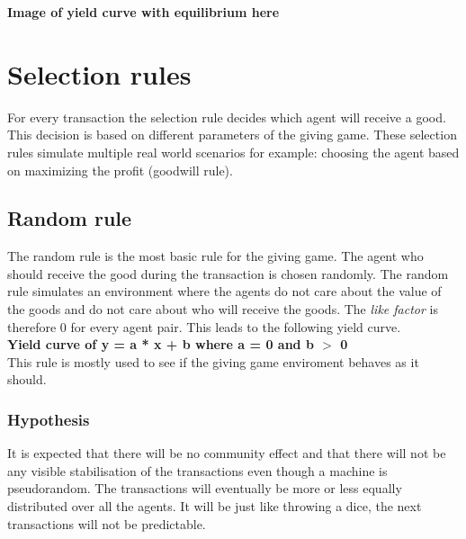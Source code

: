 \documentclass[twoside,openright]{uva-bachelor-thesis}
\begin{document}
\textbf{Image of yield curve with equilibrium here}


\chapter{Selection rules}
For every transaction the selection rule decides which agent will receive a good. This decision is based on different parameters of the giving game. These selection rules simulate  multiple real world scenarios for example: choosing the agent based on maximizing the profit (goodwill rule).

\section{Random rule}
The random rule is the most basic rule for the giving game. The agent who should receive the good during the transaction is chosen randomly. The random rule simulates an environment where the agents do not care about the value of the goods and do not care about who will receive the goods. The \textit{like factor} is therefore 0 for every agent pair. This leads to the following yield curve.
\\
\textbf{Yield curve of y = a * x + b where a = 0 and b $>$ 0}
\\
This rule is mostly used to see if the giving game enviroment behaves as it should.

\subsection{Hypothesis}
It is expected that there will be no community effect and that there will not be any visible stabilisation of the transactions even though a machine is pseudorandom. The transactions will eventually be more or less equally distributed over all the agents. It will be just like throwing a dice, the next transactions will not be predictable. 
\end{document}
